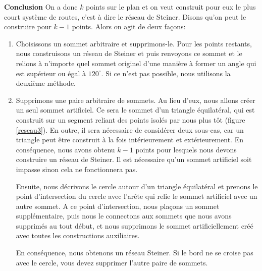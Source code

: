 \documentclass[10pt,a4paper]{article}%
\theoremstyle{theorem}
\theoremstyle{definition}
\begin{document}
        		\textbf{Conclusion}
        		On a donc $k$ points sur le plan et on veut construit pour eux le plus court système de routes, c'est à dire le réseau de Steiner. Disons qu'on peut le construire pour $k-1$ points. Alors on agit de deux façons:
        		\begin{enumerate}
        			\item Choisissons un sommet arbitraire et supprimons-le. Pour les points restants, nous construisons un réseau de Steiner et puis renvoyons ce sommet et le relions à n'importe quel sommet originel d'une manière à former un angle qui est supérieur ou égal à $120^\circ$. Si ce n'est pas possible, nous utilisons la deuxième méthode.
        			\item Supprimons une paire arbitraire de sommets. Au lieu d'eux, nous allons créer un seul sommet artificiel. Ce sera le sommet d'un triangle équilatéral, qui est construit sur un segment reliant des points isolés par nous plus tôt (figure \ref{reseau3}). En outre, il sera nécessaire de considérer deux sous-cas, car un triangle peut être construit à la fois intérieurement et extérieurement. En conséquence, nous avons obtenu $k-1$ points pour lesquels nous devons construire un réseau de Steiner. Il est nécessaire qu'un sommet artificiel soit impasse sinon cela ne fonctionnera pas.
        			
        			Ensuite, nous décrivons le cercle autour d'un triangle équilatéral et prenons le point d'intersection du cercle avec l'arête qui relie le sommet artificiel avec un autre sommet. A ce point d'intersection, nous plaçons un sommet supplémentaire, puis nous le connectons aux sommets que nous avons supprimés au tout début, et nous supprimons le sommet artificiellement créé avec toutes les constructions auxiliaires. 
        			
        			En conséquence, nous obtenons un réseau Steiner. Si le bord ne se croise pas avec le cercle, vous devez supprimer l'autre paire de sommets.
        			

\end{enumerate}
\end{document}
